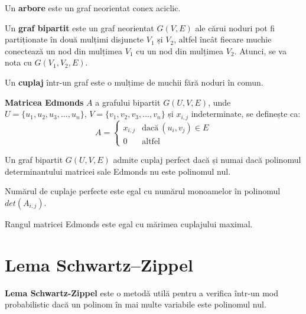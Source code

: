 \begin{defn}
  Un \textbf{arbore} este un graf neorientat conex aciclic.
\end{defn}

\begin{defn}
  Un \textbf{graf bipartit} este un graf neorientat $G(V, E)$ ale cărui noduri pot fi
  partiționate în două mulțimi disjuncte $V_{1}$ și $V_{2}$, altfel încât fiecare muchie
  conectează un nod din mulțimea $V_{1}$ cu un nod din mulțimea $V_{2}$. Atunci,
  se va nota cu $G(V_{1}, V_{2}, E)$.
\end{defn}

\begin{defn}
  Un \textbf{cuplaj} într-un graf este o mulțime de muchii fără noduri în comun.
\end{defn}

\begin{defn}
  \textbf{Matricea Edmonds} $A$ a grafului bipartit $G(U, V, E)$, unde
  $U = \{u_{1}, u_{2}, u_{3}, \ldots, u_{n}\}$,
  $V = \{v_{1}, v_{2}, v_{3}, \ldots, v_{n}\}$ și $x_{i,j}$ indeterminate, se definește ca:
   \begin{equation}
    A=
    \begin{cases}
      x_{i,j} & \text{dacă}\ (u_{i}, v_{j}) \in E \\
      0 & \text{altfel}
    \end{cases}
  \end{equation}
\end{defn}

\begin{thm}
  \label{edmonds}
  Un graf bipartit $G(U, V, E)$ admite cuplaj perfect dacă și numai dacă
  polinomul determinantului matricei sale Edmonds nu este polinomul nul.
\end{thm}

\begin{clr}
  Numărul de cuplaje perfecte este egal cu numărul monoamelor în polinomul $det(A_{i,j})$.
\end{clr}

\begin{clr}
  Rangul matricei Edmonds este egal cu mărimea cuplajului maximal.
\end{clr}

\pagebreak

\section{Lema Schwartz–Zippel}
\textbf{Lema Schwartz-Zippel} este o metodă utilă pentru a verifica într-un mod
probabilistic dacă un polinom în mai multe variabile este polinomul nul.

